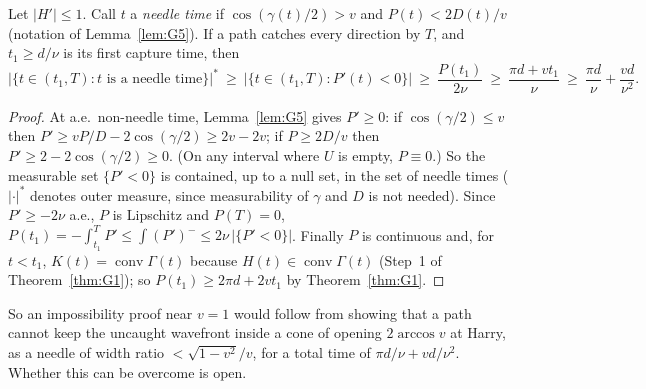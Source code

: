\begin{corollary}\label{cor:G6}
Let $|H'|\le1$. Call $t$ a \emph{needle time} if $\cos(\gamma(t)/2)>v$ and $P(t)<2D(t)/v$ (notation of Lemma~\ref{lem:G5}). If a
path catches every direction by $T$, and $t_1\ge d/\nu$ is its first capture time, then
\[
\bigl|\{t\in(t_1,T):t\text{ is a needle time}\}\bigr|^*\ \ge\ \bigl|\{t\in(t_1,T):P'(t)<0\}\bigr|\ \ge\ \frac{P(t_1)}{2\nu}\ \ge\ \frac{\pi d+vt_1}{\nu}\ \ge\ \frac{\pi d}{\nu}+\frac{vd}{\nu^2}.
\]
\end{corollary}
\begin{proof}
At a.e.\ non-needle time, Lemma~\ref{lem:G5} gives $P'\ge0$: if $\cos(\gamma/2)\le v$ then $P'\ge vP/D-2\cos(\gamma/2)\ge2v-2v$; if $P\ge2D/v$
then $P'\ge2-2\cos(\gamma/2)\ge0$. (On any interval where $U$ is empty, $P\equiv0$.) So the measurable set $\{P'<0\}$ is contained, up to a
null set, in the set of needle times ($|\cdot|^*$ denotes outer measure, since measurability of $\gamma$ and $D$ is not needed). Since
$P'\ge-2\nu$ a.e., $P$ is Lipschitz and $P(T)=0$, $P(t_1)=-\int_{t_1}^TP'\le\int(P')^-\le2\nu\,|\{P'<0\}|$. Finally $P$ is continuous and, for $t<t_1$,
$K(t)=\operatorname{conv}\Gamma(t)$ because $H(t)\in\operatorname{conv}\Gamma(t)$ (Step~1 of Theorem~\ref{thm:G1}); so $P(t_1)\ge2\pi d+2vt_1$
by Theorem~\ref{thm:G1}.
\end{proof}

\begin{remark}
So an impossibility proof near $v=1$ would follow from showing that a path cannot keep the uncaught wavefront inside a cone of
opening $2\arccos v$ at Harry, as a needle of width ratio $<\sqrt{1-v^2}/v$, for a total time of $\pi d/\nu+vd/\nu^2$. Whether this
can be overcome is open.
\end{remark}
